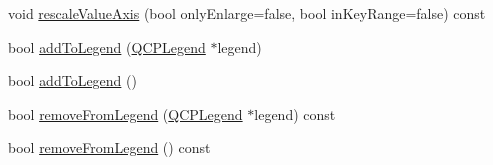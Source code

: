 \begin{DoxyCompactItemize}
\item 
void \hyperlink{class_q_c_p_abstract_plottable_a4336ede4d4ef615022356316d9e9c362}{rescale\+Value\+Axis} (bool only\+Enlarge=false, bool in\+Key\+Range=false) const 
\item 
bool \hyperlink{class_q_c_p_abstract_plottable_aa64e93cb5b606d8110d2cc0a349bb30f}{add\+To\+Legend} (\hyperlink{class_q_c_p_legend}{Q\+C\+P\+Legend} $\ast$legend)
\item 
bool \hyperlink{class_q_c_p_abstract_plottable_a70f8cabfd808f7d5204b9f18c45c13f5}{add\+To\+Legend} ()
\item 
bool \hyperlink{class_q_c_p_abstract_plottable_a26d936d11852ea08e6bc0edae3a514a2}{remove\+From\+Legend} (\hyperlink{class_q_c_p_legend}{Q\+C\+P\+Legend} $\ast$legend) const 
\item 
bool \hyperlink{class_q_c_p_abstract_plottable_aa1f350e510326d012b9a9c9249736c83}{remove\+From\+Legend} () const 
\end{DoxyCompactItemize}
